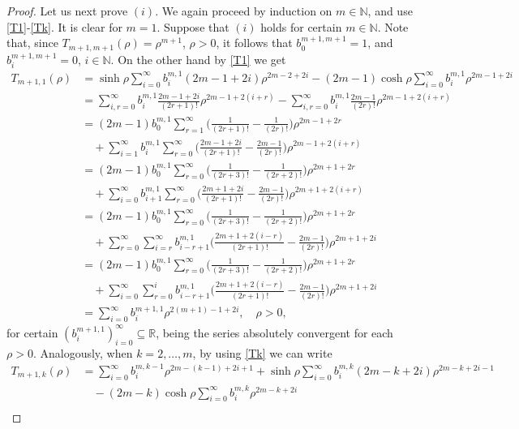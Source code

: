 \documentclass[a4paper,10pt, reqno]{amsart}
\theoremstyle{definition}
\theoremstyle{remark}
\numberwithin{equation}{section}
\begin{document}
{\begin{proof}
Let us next prove $(i)$. We again proceed by induction on $m\in \mathbb N$, and use \eqref{T1}-\eqref{Tk}. It is clear for $m=1$. Suppose that $(i)$ holds for certain $m\in \mathbb N$. Note that, since $T_{m+1,m+1}(\rho )=\rho ^{m+1}$, $\rho >0$, it follows that $b_0^{m+1,m+1}=1$, and $b_i^{m+1,m+1}=0$, $i\in \mathbb N$. On the other hand by \eqref{T1} we get
\begin{align*}
    T_{m+1,1}(\rho )&=\sinh \rho \sum_{i=0}^\infty b_i^{m,1}(2m-1+2i)\rho ^{2m-2+2i}-(2m-1)\cosh \rho \sum_{i=0}^\infty b_i^{m,1}\rho ^{2m-1+2i}\\
    &=\sum_{i,r=0}^\infty b_i^{m,1}\frac{2m-1+2i}{(2r+1)!}\rho ^{2m-1+2(i+r)}-\sum_{i,r=0}^\infty b_i^{m,1}\frac{2m-1}{(2r)!}\rho ^{2m-1+2(i+r)}\\
    &=(2m-1)b_0^{m,1}\sum_{r=1}^\infty \Big(\frac{1}{(2r+1)!}-\frac{1}{(2r)!}\Big)\rho ^{2m-1+2r}\\
    &\quad +\sum_{i=1}^\infty b_i^{m,1}\sum_{r=0}^\infty \Big(\frac{2m-1+2i}{(2r+1)!}-\frac{2m-1}{(2r)!}\Big)\rho ^{2m-1+2(i+r)}\\
    &=(2m-1)b_0^{m,1}\sum_{r=0}^\infty \Big(\frac{1}{(2r+3)!}-\frac{1}{(2r+2)!}\Big)\rho ^{2m+1+2r}\\
    &\quad +\sum_{i=0}^\infty b_{i+1}^{m,1}\sum_{r=0}^\infty \Big(\frac{2m+1+2i}{(2r+1)!}-\frac{2m-1}{(2r)!}\Big)\rho ^{2m+1+2(i+r)}\\
     &=(2m-1)b_0^{m,1}\sum_{r=0}^\infty \Big(\frac{1}{(2r+3)!}-\frac{1}{(2r+2)!}\Big)\rho ^{2m+1+2r}\\
    &\quad +\sum_{r=0}^\infty \sum_{i=r}^\infty b_{i-r+1}^{m,1}\Big(\frac{2m+1+2(i-r)}{(2r+1)!}-\frac{2m-1}{(2r)!}\Big)\rho ^{2m+1+2i}\\
     &=(2m-1)b_0^{m,1}\sum_{r=0}^\infty \Big(\frac{1}{(2r+3)!}-\frac{1}{(2r+2)!}\Big)\rho ^{2m+1+2r}\\
    &\quad +\sum_{i=0}^\infty \sum_{r=0}^i b_{i-r+1}^{m,1}\Big(\frac{2m+1+2(i-r)}{(2r+1)!}-\frac{2m-1}{(2r)!}\Big)\rho ^{2m+1+2i}\\
    &=\sum_{i=0}^\infty b_i^{m+1,1}\rho ^{2(m+1)-1+2i},\quad \rho >0,
\end{align*}
for certain $(b_i^{m+1,1})_{i=0}^\infty \subseteq \mathbb R$, being the series absolutely convergent for each $\rho >0$. Analogously, when $k=2,\ldots, m$, by using \eqref{Tk} we can write
\begin{align*}
T_{m+1,k}(\rho )&=\sum_{i=0}^\infty b_i^{m,k-1}\rho ^{2m-(k-1)+2i+1}+\sinh \rho \sum_{i=0}^\infty b_i^{m,k}(2m-k+2i)\rho ^{2m-k+2i-1}\\
&\quad -(2m-k)\cosh \rho \sum_{i=0}^\infty b_i^{m,k}\rho ^{2m-k+2i} \\

\end{align*}
\end{proof}}
\end{document}
